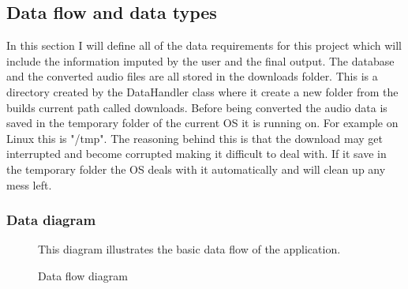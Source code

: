 \documentclass{article}
\begin{document}
\subsection{Data flow and data types}
In this section I will define all of the data requirements for this project which will include
the information imputed by the user and the final output. The database and the converted audio
files are all stored in the downloads folder. This is a directory created by the DataHandler
class where it create a new folder from the builds current path called downloads. Before being
converted the audio data is saved in the temporary folder of the current OS it is running on.
For example on Linux this is "/tmp". The reasoning behind this is that the download may get
interrupted and become corrupted making it difficult to deal with. If it save in the temporary
folder the OS deals with it automatically and will clean up any mess left.
\subsubsection{Data diagram}
\begin{figure}[H]
    \caption{Data flow diagram} \label{fig:Data flow diagram}
    This diagram illustrates the basic data flow of the application.
\end{figure}
\end{document}
